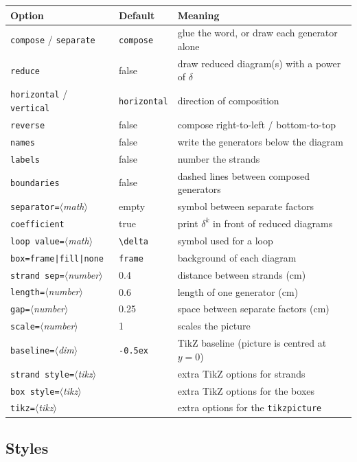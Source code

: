 \documentclass[11pt]{article}
\newcommand\opt[1]{\texttt{#1}}
\newcommand\meta[1]{\ensuremath{\langle}\textit{#1}\ensuremath{\rangle}}
\begin{document}
\begin{center}
\small
\begin{tabular}{@{}lll@{}}
  \toprule
  Option & Default & Meaning \\
  \midrule
  \opt{compose} / \opt{separate} & \opt{compose} & glue the word, or draw each generator alone \\
  \opt{reduce} & false & draw reduced diagram(s) with a power of $\delta$ \\
  \opt{horizontal} / \opt{vertical} & \opt{horizontal} & direction of composition \\
  \opt{reverse} & false & compose right-to-left / bottom-to-top \\
  \opt{names} & false & write the generators below the diagram \\
  \opt{labels} & false & number the strands \\
  \opt{boundaries} & false & dashed lines between composed generators \\
  \opt{separator=}\meta{math} & empty & symbol between separate factors \\
  \opt{coefficient} & true & print $\delta^k$ in front of reduced diagrams \\
  \opt{loop value=}\meta{math} & \verb|\delta| & symbol used for a loop \\
  \opt{box=frame|fill|none} & \opt{frame} & background of each diagram \\
  \opt{strand sep=}\meta{number} & 0.4 & distance between strands (cm) \\
  \opt{length=}\meta{number} & 0.6 & length of one generator (cm) \\
  \opt{gap=}\meta{number} & 0.25 & space between separate factors (cm) \\
  \opt{scale=}\meta{number} & 1 & scales the picture \\
  \opt{baseline=}\meta{dim} & \verb|-0.5ex| & TikZ baseline (picture is centred at $y=0$) \\
  \opt{strand style=}\meta{tikz} & & extra TikZ options for strands \\
  \opt{box style=}\meta{tikz} & & extra TikZ options for the boxes \\
  \opt{tikz=}\meta{tikz} & & extra options for the \texttt{tikzpicture} \\
  \bottomrule
\end{tabular}
\end{center}

\subsection{Styles}
\end{document}
